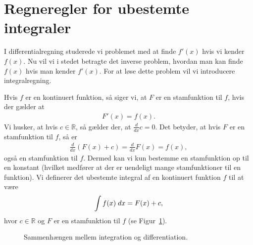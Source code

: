 \section{Regneregler for ubestemte integraler}
\noindent I differentialregning studerede vi problemet med at finde $f'(x)$ hvis vi kender $f(x)$. Nu vil vi i stedet betragte det inverse problem, hvordan man kan finde $f(x)$ hvis man kender $f'(x)$. For at løse dette problem vil vi introducere integralregning. 

Hvis $f$ er en kontinuert funktion, så siger vi, at $F$ er en stamfunktion til $f$, hvis der gælder at
\begin{align*}
F'(x)=f(x).
\end{align*}
Vi husker, at hvis $c \in \mathbb{R}$, så gælder der, at $\frac{d}{d x}c=0$. Det betyder, at hvis $F$ er en stamfunktion til $f$, så er 
\begin{align*}
\frac{d}{dx}(F(x)+c) = \frac{d}{dx} F(x) = f(x),
\end{align*}
også en stamfunktion til $f$. Dermed kan vi kun bestemme en stamfunktion op til en konstant (hvilket medfører at der er uendeligt mange stamfunktioner til en funktion). Vi definerer det ubestemte integral af en kontinuert funktion $f$ til at være
\begin{align*}
\int f(x) \; d x = F(x) + c,
\end{align*}
hvor $c \in \mathbb{R}$ og $F$ er en stamfunktion til $f$ (se Figur~\ref{fig:ubestemtint1et}).
\begin{figure}[!htbp]
  \pgfplotsset{width=0.5\textwidth,compat=1.11}
  \centering
  \caption{Sammenhængen mellem integration og differentiation.}
  \label{fig:ubestemtint1et}
\end{figure}
